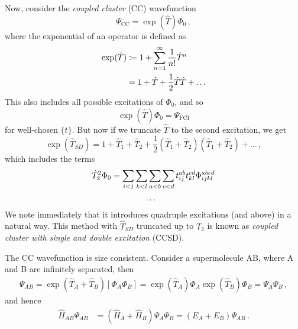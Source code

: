 \documentclass{article}
\theoremstyle{plain}\theoremheaderfont{\normalfont\itshape}\theorembodyfont{\rmfamily}\theoremseparator{.}\newtheorem*{rem}{Remark}\newtheorem*{ex}{Example}\newtheorem*{proof}{Proof}\newtheorem*{altp}{Alternative proof}
\theoremstyle{plain}\theoremheaderfont{\normalfont\bfseries}\theorembodyfont{\rmfamily}\theoremseparator{.}\newtheorem{thm}{Theorem}[section]\newtheorem{lem}[thm]{Lemma}\newtheorem{prop}[thm]{Proposition}\newtheorem*{cor}{Corollary}\newtheorem{defn}[thm]{Definition}\newtheorem{clm}[thm]{Claim}\newtheorem{clminproof}{Claim}
\theoremstyle{break}\theoremheaderfont{\normalfont\itshape}\theorembodyfont{\rmfamily}\theoremseparator{.\medskip}\newtheorem*{proofskip}{Proof}\newtheorem*{exs}{Examples}\newtheorem*{rems}{Remarks}
\theoremstyle{break}\theoremheaderfont{\normalfont\bfseries}\theorembodyfont{\rmfamily}\theoremseparator{.\medskip}\newtheorem{lemskip}[thm]{Lemma}\newtheorem{defnskip}[thm]{Definition}\newtheorem{propskip}[thm]{Proposition}\newtheorem{thmskip}[thm]{Theorem}
\numberwithin{equation}{section}
\begin{document}
    Now, consider the \textit{coupled cluster} (CC) wavefunction
    \begin{equation}
        \Psi_{\text{CC}}=\exp(\hat{T})\Phi_0\,,
    \end{equation}
    where the exponential of an operator is defined as
    \begin{align}
        \exp(\hat{T})&\coloneqq 1+\sum_{n=1}^{\infty}\frac{1}{n!}\hat{T}^n\notag\\
        &=1+\hat{T}+\frac{1}{2}\hat{T}\hat{T}+\dots
    \end{align}
    This also includes all possible excitations of \(\Phi_0\), and so
    \begin{equation}
        \exp(\hat{T})\Phi_0=\Psi_{\text{FCI}}
    \end{equation}
    for well-chosen \(\{t\}\). But now if we truncate \(\hat{T}\) to the second excitation, we get
    \begin{equation}
        \exp(\hat{T}_{SD})=1+\hat{T}_1+\hat{T}_2+\frac{1}{2}(\hat{T}_1+\hat{T}_2)(\hat{T}_1+\hat{T}_2)+\dots\,,
    \end{equation}
    which includes the terms
    \begin{align}
        \hat{T}_2^2\Phi_0&=\sum_{i<j}\sum_{k<l}\sum_{a<b}\sum_{c<d}t_{ij}^{ab}t_{kl}^{cd}\Phi_{ijkl}^{abcd}\\
        &\qquad\qquad\dots \notag
    \end{align}
    We note immediately that it introduces quadruple excitations (and above) in a natural way. This method with \(\hat{T}_{SD}\) truncated up to \(\hat{T}_2\) is known as \textit{coupled cluster with single and double excitation} (CCSD).  

    The CC wavefunction is size consistent. Consider a supermolecule AB, where A and B are infinitely separated, then
    \begin{eqnarray}
        \Psi_{AB}=\exp(\hat{T}_A+\hat{T}_B)[\Phi_A\Phi_B]=\exp(\hat{T}_A)\Phi_A\exp(\hat{T}_B)\Phi_B=\Psi_A\Psi_B\,,
    \end{eqnarray}
    and hence
    \begin{eqnarray}
        \hat{H}_{AB}\Psi_{AB}&=(\hat{H}_A+\hat{H}_{B})\Psi_A\Psi_B=(E_A+E_B)\Psi_{AB}\,.
    \end{eqnarray}
\end{document}
